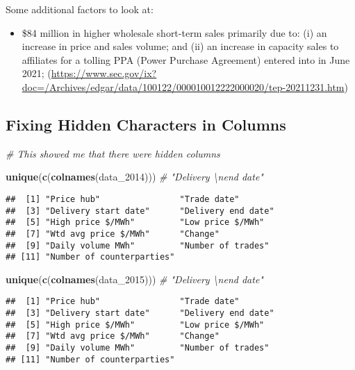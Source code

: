 \documentclass[
]{article}
\newenvironment{Shaded}{\begin{snugshade}}{\end{snugshade}}
\newcommand{\CommentTok}[1]{\textcolor[rgb]{0.56,0.35,0.01}{\textit{#1}}}
\newcommand{\FunctionTok}[1]{\textcolor[rgb]{0.13,0.29,0.53}{\textbf{#1}}}
\newcommand{\NormalTok}[1]{#1}
\providecommand{\tightlist}{%
  \setlength{\itemsep}{0pt}\setlength{\parskip}{0pt}}
\begin{document}
Some additional factors to look at:

\begin{itemize}
\tightlist
\item
  \$84 million in higher wholesale short-term sales primarily due to:
  (i) an increase in price and sales volume; and (ii) an increase in
  capacity sales to affiliates for a tolling PPA (Power Purchase
  Agreement) entered into in June 2021;
  (\url{https://www.sec.gov/ix?doc=/Archives/edgar/data/100122/000010012222000020/tep-20211231.htm})
\end{itemize}

\subsection{Fixing Hidden Characters in
Columns}\label{fixing-hidden-characters-in-columns}

\begin{Shaded}
\begin{Highlighting}[]
\CommentTok{\# This showed me that there were hidden columns}

\FunctionTok{unique}\NormalTok{(}\FunctionTok{c}\NormalTok{(}\FunctionTok{colnames}\NormalTok{(data\_2014))) }\CommentTok{\# "Delivery \textbackslash{}nend date"}
\end{Highlighting}
\end{Shaded}

\begin{verbatim}
##  [1] "Price hub"                "Trade date"              
##  [3] "Delivery start date"      "Delivery end date"       
##  [5] "High price $/MWh"         "Low price $/MWh"         
##  [7] "Wtd avg price $/MWh"      "Change"                  
##  [9] "Daily volume MWh"         "Number of trades"        
## [11] "Number of counterparties"
\end{verbatim}

\begin{Shaded}
\begin{Highlighting}[]
\FunctionTok{unique}\NormalTok{(}\FunctionTok{c}\NormalTok{(}\FunctionTok{colnames}\NormalTok{(data\_2015))) }\CommentTok{\# "Delivery \textbackslash{}nend date"}
\end{Highlighting}
\end{Shaded}

\begin{verbatim}
##  [1] "Price hub"                "Trade date"              
##  [3] "Delivery start date"      "Delivery end date"       
##  [5] "High price $/MWh"         "Low price $/MWh"         
##  [7] "Wtd avg price $/MWh"      "Change"                  
##  [9] "Daily volume MWh"         "Number of trades"        
## [11] "Number of counterparties"
\end{verbatim}
\end{document}
